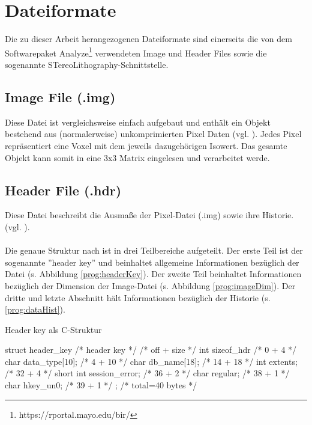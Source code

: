 \section{Dateiformate}
\label{sec:DateiEinf}
Die zu dieser Arbeit herangezogenen Dateiformate sind einerseits die von dem Softwarepaket Analyze\footnote{https://rportal.mayo.edu/bir/} verwendeten Image und Header Files sowie die sogenannte STereoLithography-Schnittstelle. 

\subsection{Image File (.img)}
Diese Datei ist vergleichsweise einfach aufgebaut und enthält ein Objekt bestehend aus (normalerweise) unkomprimierten Pixel Daten (vgl. \citep{AnalyzeFormat}). Jedes Pixel repräsentiert eine Voxel mit dem jeweils dazugehörigen Isowert. Das gesamte Objekt kann somit in eine 3x3 Matrix eingelesen und verarbeitet werde.

\subsection{Header File (.hdr)}
\label{sec:DateiHead}
Diese Datei beschreibt die Ausmaße der Pixel-Datei (.img) sowie ihre Historie. (vgl. \citep{AnalyzeFormat}). \\\\
Die genaue Struktur nach \citep{AnalyzeFormat} ist in drei Teilbereiche aufgeteilt. Der erste Teil ist der sogenannte ''header key'' und beinhaltet allgemeine Informationen bezüglich der Datei (s. Abbildung \ref{prog:headerKey}). Der zweite Teil beinhaltet Informationen bezüglich der Dimension der Image-Datei (s. Abbildung \ref{prog:imageDim}). Der dritte und letzte Abschnitt hält Informationen bezüglich der Historie (s. \ref{prog:dataHist}).

\begin{program}[H]
	\caption{Header key als C-Struktur \citep{AnalyzeFormat}}
	\label{prog:headerKey}
	\begin{CCode}
struct header_key /* header key */
{ /* off + size */
	int sizeof_hdr /* 0 + 4 */
	char data_type[10]; /* 4 + 10 */
	char db_name[18]; /* 14 + 18 */
	int extents; /* 32 + 4 */
	short int session_error; /* 36 + 2 */
	char regular; /* 38 + 1 */
	char hkey_un0; /* 39 + 1 */
}; /* total=40 bytes */ 
	\end{CCode}
\end{program}

